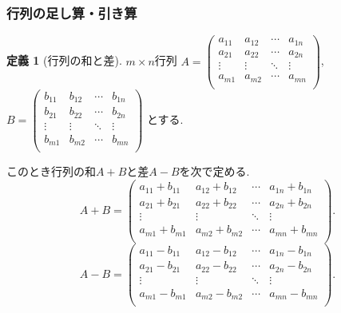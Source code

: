 \documentclass[dvipdfmx,a4paper,11pt]{article}
\theoremstyle{definition}
\newtheorem{dfn}[thm]{定義}
\begin{document}
 
 \subsubsection{行列の足し算・引き算}
 \begin{tcolorbox}[
    colback = white,
    colframe = green!35!black,
    fonttitle = \bfseries,
    breakable = true]
    \begin{dfn}[行列の和と差]
    \text{}
 
$m \times n$行列
$
A=\begin{pmatrix}
a_{11}& a_{12} & \cdots &a_{1n} \\
a_{21}& a_{22} & \cdots &a_{2n} \\
\vdots& \vdots	&	\ddots   &	\vdots \\
a_{m1}& a_{m2} & \cdots &a_{mn} \\
\end{pmatrix}
$, 
$
B=\begin{pmatrix}
b_{11}& b_{12} & \cdots &b_{1n} \\
b_{21}& b_{22} & \cdots &b_{2n} \\
\vdots& \vdots	&	\ddots   &	\vdots \\
b_{m1}& b_{m2} & \cdots &b_{mn} \\
\end{pmatrix}
$
とする.

このとき行列の和$A+B$と差$A-B$を次で定める.
$$
A+B=
\begin{pmatrix}
a_{11}+b_{11}& a_{12}+b_{12}& \cdots &a_{1n} +b_{1n}\\
a_{21}+b_{21}& a_{22}+b_{22}& \cdots &a_{2n}+b_{2n} \\
\vdots& \vdots	&	\ddots   &	\vdots \\
a_{m1}+b_{m1}& a_{m2} +b_{m2}& \cdots &a_{mn} +b_{mn}\\
\end{pmatrix}.
$$
$$
A-B=
\begin{pmatrix}
a_{11}-b_{11}& a_{12}-b_{12}& \cdots &a_{1n} -b_{1n}\\
a_{21}-b_{21}& a_{22}-b_{22}& \cdots &a_{2n}-b_{2n} \\
\vdots& \vdots	&	\ddots   &	\vdots \\
a_{m1}-b_{m1}& a_{m2}-b_{m2}& \cdots &a_{mn}-b_{mn}\\
\end{pmatrix}.
$$
  \end{dfn}
 \end{tcolorbox}
 
\end{document}

